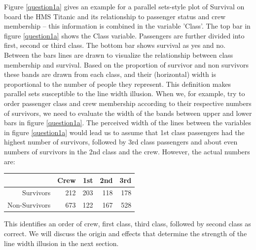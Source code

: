 Figure \ref{question1a} gives an example for a parallel sets-style plot of Survival on board the HMS Titanic  \citep{dawson:1995} and its relationship to passenger status and crew membership -- this information is combined in the variable 'Class'.
 The top bar in figure \ref{question1a} shows the Class variable. Passengers are further divided into first, second or third class. The bottom bar shows survival  as yes and no. Between the bars lines are drawn to visualize the relationship between class membership and  survival. Based on the proportion of survivor and non survivors these bands are drawn from each class, and their (horizontal) width is proportional to the number of people they represent. 
This definition makes parallel sets susceptible to the line width illusion. When we, for example, try to order passenger class and crew membership according to their respective numbers of survivors, we need to evaluate the width of the bands between upper and lower bars in figure \ref{question1a}.
The  perceived width of the lines between the variables in figure \ref{question1a} would  lead us to assume that 1st class passengers had the highest number of survivors, followed by 3rd class passengers and about even numbers of survivors in the 2nd class  and  the crew. However, the  actual numbers are:
%
\begin{center}
\begin{tabular}{rrrrr}
& Crew & 1st & 2nd & 3rd \\ \hline
Survivors & 212 & 203 & 118 & 178\\
Non-Survivors & 673 & 122 & 167 &  528  
\end{tabular}
\end{center}
This identifies an order of crew, first class, third class, followed by second class as correct. We will discuss the origin and effects that determine the strength of the line width illusion in the next section.



